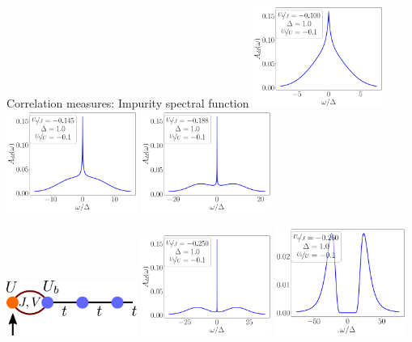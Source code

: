 \documentclass[aspectratio=169]{beamer}
\begin{document}
\begin{frame}[noframenumbering]{Correlation measures: Impurity spectral function}
\includegraphics[width=0.32\textwidth]{./figures/spec_func_Ub_by_J=-0.100.pdf}
\includegraphics[width=0.32\textwidth]{./figures/spec_func_Ub_by_J=-0.145.pdf}
\includegraphics[width=0.32\textwidth]{./figures/spec_func_Ub_by_J=-0.188.pdf}

\includegraphics[width=0.32\textwidth]{./figures/sf_pointer1.pdf}
\includegraphics[width=0.32\textwidth]{./figures/spec_func_Ub_by_J=-0.250.pdf}
\includegraphics[width=0.32\textwidth]{./figures/spec_func_Ub_by_J=-0.26.pdf}
\end{frame}
\end{document}
